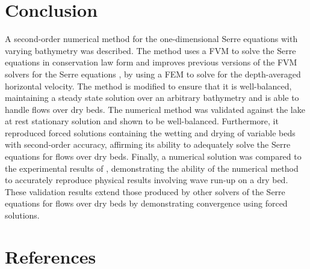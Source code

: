 \documentclass[times]{elsarticle}
\begin{document}
\section{Conclusion}
A second-order numerical method for the one-dimensional Serre equations with varying bathymetry was described. The method uses a FVM to solve the Serre equations in conservation law form and improves previous versions of the FVM solvers for the Serre equations \cite{Zoppou-etal-2017}, by using a FEM to solve for the depth-averaged horizontal velocity. The method is modified to ensure that it is well-balanced, maintaining a steady state solution over an arbitrary bathymetry and is able to handle flows over dry beds. The numerical method was validated against the lake at rest stationary solution and shown to be well-balanced. Furthermore, it reproduced forced solutions containing the wetting and drying of variable beds with second-order accuracy, affirming its ability to adequately solve the Serre equations for flows over dry beds. Finally, a numerical solution was compared to the experimental results of \citet{Synolakis-1987-523}, demonstrating the ability of the numerical method to accurately reproduce physical results involving wave run-up on a dry bed. These validation results extend those produced by other solvers of the Serre equations for flows over dry beds
\cite{Tissier-2011,Li-2014-169,Filippini-etal-2016-381,DoCarmo-2019-125} by demonstrating convergence using forced solutions.


\section*{References}


\end{document}
